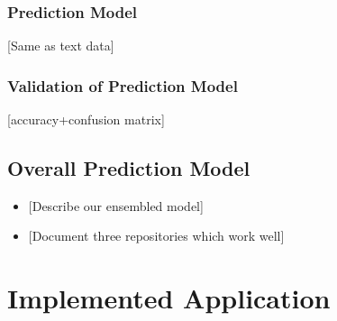 \documentclass[%
a4paper,
DIV12,
2.5headlines,
bigheadings,
titlepage,
openbib,
]{scrartcl}
\begin{document}
\subsubsection{Prediction Model}\label{prediction-model-2}

{[}Same as text data{]}

\subsubsection{Validation of Prediction
Model}\label{validation-of-prediction-model-2}

{[}accuracy+confusion matrix{]}

\subsection{Overall Prediction
Model}\label{overall-prediction-model}

\begin{itemize}
\tightlist
\item
  {[}Describe our ensembled model{]}
\item
  {[}Document three repositories which work well{]}
\end{itemize}

\section{Implemented Application}\label{implemented-application}
\end{document}
